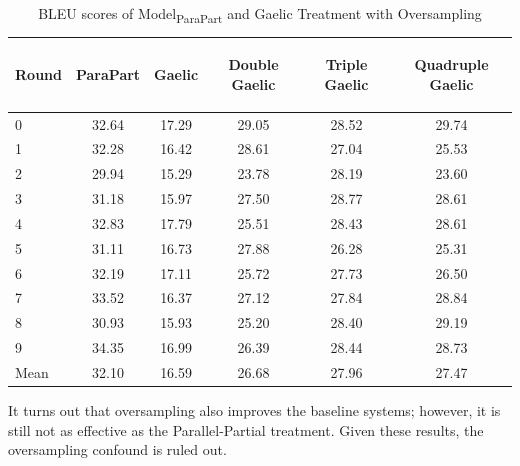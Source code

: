 \documentclass[final]{ua-thesis}
\numberwithin{equation}{section}
\begin{document}
\begin{table}[ht]
\centering
\begin{tabular}{lccccc}
  \hline
\begin{sideways} Round \end{sideways} & \begin{sideways} ParaPart \end{sideways} & \begin{sideways} Gaelic \end{sideways} & \begin{sideways} Double Gaelic  \end{sideways} & \begin{sideways} Triple Gaelic \end{sideways} & \begin{sideways} Quadruple Gaelic \end{sideways} \\ 
  \hline
0 & 32.64 & 17.29 & 29.05 & 28.52 & 29.74 \\ 
  1 & 32.28 & 16.42 & 28.61 & 27.04 & 25.53 \\ 
  2 & 29.94 & 15.29 & 23.78 & 28.19 & 23.60 \\ 
  3 & 31.18 & 15.97 & 27.50 & 28.77 & 28.61 \\ 
  4 & 32.83 & 17.79 & 25.51 & 28.43 & 28.61 \\ 
  5 & 31.11 & 16.73 & 27.88 & 26.28 & 25.31 \\ 
  6 & 32.19 & 17.11 & 25.72 & 27.73 & 26.50 \\ 
  7 & 33.52 & 16.37 & 27.12 & 27.84 & 28.84 \\ 
  8 & 30.93 & 15.93 & 25.20 & 28.40 & 29.19 \\ 
  9 & 34.35 & 16.99 & 26.39 & 28.44 & 28.73 \\ 
   \hline
Mean & 32.10 & 16.59 & 26.68 & 27.96 & 27.47 \\ 
   \hline
\end{tabular}
\caption{BLEU scores of Model\textsubscript{ParaPart} and Gaelic Treatment with Oversampling} 
\label{Table:over}
\end{table}
It turns out that oversampling also improves the baseline systems; however, it is still not as effective as the Parallel-Partial treatment. Given these results, the oversampling confound is ruled out.
\end{document}
